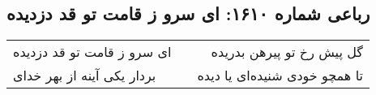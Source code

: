 \begin{center}
\section*{رباعی شماره ۱۶۱۰: ای سرو ز قامت تو قد دزدیده}
\label{sec:1610}
\begin{longtable}{l p{0.5cm} r}
ای سرو ز قامت تو قد دزدیده
&&
گل پیش رخ تو پیرهن بدریده
\\
بردار یکی آینه از بهر خدای
&&
تا همچو خودی شنیده‌ای یا دیده
\\
\end{longtable}
\end{center}
